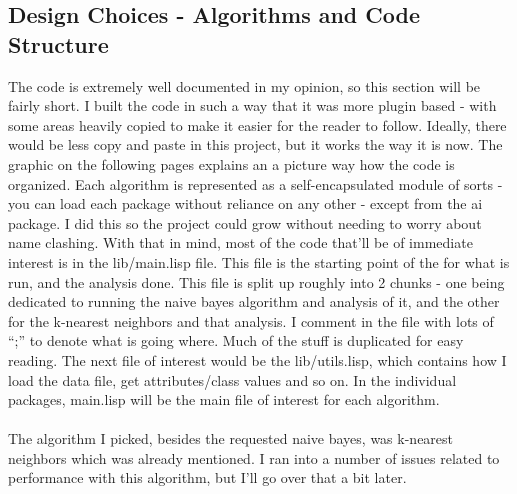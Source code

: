 \documentclass{article}
\begin{document}
\subsection{Design Choices - Algorithms and Code Structure}
The code is extremely well documented in my  opinion, so this section will be fairly short.  I built the code in such a way that it was more plugin based - with some areas heavily copied to make it easier for the reader to follow.  Ideally, there would be less copy and paste in this project, but it works the way it is now.  The graphic on the following pages explains an a picture way how the code is organized.  Each algorithm is represented as a self-encapsulated module of sorts - you can load each package without reliance on any other - except from the ai package.  I did this so the project could grow without needing to worry about name clashing.  With that in mind, most of the code that'll be of immediate interest is in the lib/main.lisp file.  This file is the starting point of the for what is run, and the analysis done.  This file is split up roughly into 2 chunks - one being dedicated to running the naive bayes algorithm and analysis of it, and the other for the k-nearest neighbors and that analysis.  I comment in the file with lots of ``;'' to denote what is going where.  Much of the stuff is duplicated for easy reading.  The next file of interest would be the lib/utils.lisp, which contains how I load the data file, get attributes/class values and so on.  In the individual packages, main.lisp will be the main file of interest for each algorithm.\\
\\
The algorithm I picked, besides the requested naive bayes, was k-nearest neighbors which was already mentioned.  I ran into a number of issues related to performance with this algorithm, but I'll go over that a bit later.

\end{document}
